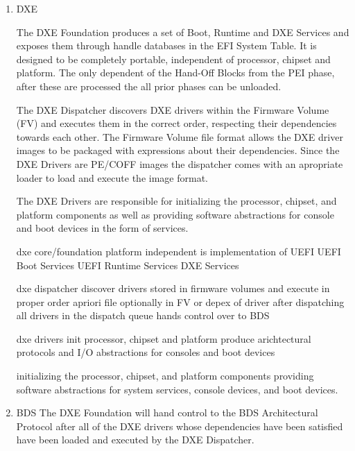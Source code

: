 \begin{enumerate}
    \item{\acf{DXE}}




    The DXE Foundation produces a set of Boot, Runtime and DXE Services and exposes them through handle databases in the EFI System Table. It is designed to be completely portable, independent of processor, chipset and platform. The only dependent of the Hand-Off Blocks from the PEI phase, after these are processed the all prior phases can be unloaded.


    The DXE Dispatcher discovers DXE drivers within the Firmware Volume (FV) and executes them in the correct order, respecting their dependencies towards each other. The Firmware Volume file format allows the DXE driver images to be packaged with expressions about their dependencies. Since the DXE Drivers are PE/COFF images the dispatcher comes with an apropriate loader to load and execute the image format.



    The DXE Drivers are responsible for initializing the processor, chipset,
    and platform components as well as providing software abstractions for console and
    boot devices in the form of services.

    dxe core/foundation
    platform independent
    is implementation of UEFI
    UEFI Boot Services
    UEFI Runtime Services
    DXE Services

    dxe dispatcher
    discover drivers stored in firmware volumes and execute in proper order
    apriori file optionally in FV or depex of driver
    after dispatching all drivers in the dispatch queue hands control over to BDS

    dxe drivers
    init processor, chipset and platform
    produce arichtectural protocols and \ac{I/O} abstractions for consoles and boot devices

    initializing the processor, chipset, and platform components
    providing software abstractions for system services, console devices, and boot devices.

    \item{\acf{BDS}}
    The DXE Foundation will hand control to the BDS Architectural Protocol after all of the DXE drivers whose dependencies have been satisfied have been loaded and executed by the DXE Dispatcher.


\end{enumerate}
